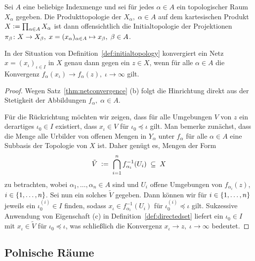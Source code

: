 \documentclass[../main/main.tex]{subfiles}
\begin{document}
	\begin{Bemerkung}
		Sei $A$ eine beliebige Indexmenge und sei für jedes $\alpha \in A$ ein topologischer Raum $X_\alpha$ gegeben. Die Produkttopologie der $X_\alpha, \; \alpha \in A$
		auf dem kartesischen Produkt $X \vcentcolon = \prod_{\alpha \in A} X_\alpha$ ist dann offensichtlich die Initialtopologie der Projektionen 
		$\pi_\beta \colon X \to X_\beta, \; x = (x_\alpha)_{\alpha \in A} \mapsto x_\beta , \; \beta \in A$.
	\end{Bemerkung}
	
	\begin{Hilfssatz}
		\label{lem: convergenceinitialtopology}
		In der Situation von Definition~\ref{def:initialtopology} konvergiert ein Netz $x = (x_\iota)_{\iota \in I}$ in $X$ genau dann gegen ein $z \in X$, wenn für alle $\alpha \in A$
		die Konvergenz $f_\alpha(x_\iota) \to f_\alpha(z), \; \iota \to \infty$ gilt.
	\end{Hilfssatz}

	\begin{proof}
		Wegen Satz~\ref{thm:netconvergence} (b) folgt die Hinrichtung direkt aus der Stetigkeit der Abbildungen $f_\alpha, \; \alpha \in A$.
		
		Für die Rückrichtung möchten wir zeigen, dass für alle Umgebungen $V$ von $z$ ein derartiges $\iota_0 \in I$ existiert, dass $x_\iota \in V$ für $\iota_0 \preceq \iota$ gilt.
		Man bemerke zunächst, dass die Menge alle Urbilder von offenen Mengen in $Y_\alpha$ unter $f_\alpha$ für alle $\alpha \in A$ eine Subbasis der Topologie von $X$ ist.
		Daher genügt es, Mengen der Form
		\[ \tilde{V} \; \vcentcolon = \; \bigcap_{i=1}^{n} f_{\alpha_i}^{-1}(U_i) \; \subseteq \; X \]
		zu betrachten, wobei $\alpha_1, \dots, \alpha_n \in A$ sind und $U_i$ offene Umgebungen von $f_{\alpha_i}(z)$, $i \in \left\{1, \dots, n\right\}$.
		Sei nun ein solches $\tilde{V}$ gegeben. Dann können wir für $i \in \left\{1, \dots, n\right\}$ jeweils ein $\iota_0^{(i)} \in I$ finden, sodass $x_\iota \in f_{\alpha_i}^{-1}(U_i)$ für 
		$\iota_0^{(i)} \preceq \iota$ gilt. Sukzessive Anwendung von Eigenschaft (c) in Definition~\ref{def:directedset} liefert ein $\iota_0 \in I$ mit 
		$x_\iota \in \tilde{V}$ für $\iota_0 \preceq \iota$, was schließlich die Konvergenz $x_\iota \to z, \; \iota \to \infty$ bedeutet.
	\end{proof}
	
	\subsection{Polnische Räume}
	
\end{document}
